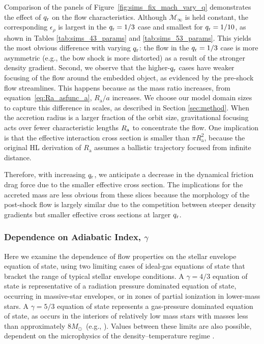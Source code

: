 Comparison of the panels of Figure~\ref{fig:sims_fix_mach_vary_q} demonstrates the effect of $q_{\rm r}$ on the flow characteristics. 
Although $\mathcal{M}_\infty$ is held constant, the corresponding $\epsilon_\rho$ is largest in the $q_{\rm r} = 1/3$ case and smallest for $q_{\rm r} = 1/10$, as shown in Tables \ref{tab:sims_43_params} and \ref{tab:sims_53_params}. This yields the most obvious difference with varying $q_{\rm r}$: the flow in the $q_{\rm r}=1/3$ case is more asymmetric (e.g., the bow shock is more distorted) as a result of the stronger density gradient. Second, we observe that the higher-$q_{\rm r}$ cases have weaker focusing of the flow around the embedded object, as evidenced by the pre-shock flow streamlines. This happens because as the mass ratio increases, from equation~\eqref{eq:Ra_asfunc_a}, $R_{\mathrm a}/a$ increases. We choose our model domain sizes to capture this difference in scales, as described in Section \ref{sec:method}. When the accretion radius is a larger fraction of the orbit size, gravitational focusing acts over fewer characteristic lengths $R_{\rm a}$ to concentrate the flow. One implication is that the effective interaction cross section is smaller than $\pi R_{\mathrm{a}}^2$, because the original HL derivation of $R_{\mathrm{a}}$ assumes a ballistic trajectory focused from infinite distance. 

Therefore, with increasing $q_{\rm r}$, we anticipate a decrease in the dynamical friction drag force due to the smaller effective cross section. The implications for the accreted mass are less obvious from these slices because the morphology of the post-shock flow is largely similar due to the competition between steeper density gradients but smaller effective cross sections at larger $q_{\rm r}$. 

\subsubsection{Dependence on Adiabatic Index, $\gamma$}\label{sec:hydro_gamma}

Here we examine the dependence of flow properties on the stellar envelope equation of state, using two limiting cases of ideal-gas equations of state that bracket the range of typical stellar envelope conditions. 
A $\gamma=4/3$ equation of state is representative of a radiation pressure dominated equation of state, occurring in massive-star envelopes, or in zones of partial ionization in lower-mass stars. A $\gamma=5/3$ equation of state represents a gas-pressure dominated equation of state, as occurs in the interiors of relatively low mass stars with masses less than approximately $ 8 M_\odot$~(e.g., \cite{MacLeod:2017,Murguia-Berthier:2017}). Values between these limits are also possible, dependent on the microphysics of the density--temperature regime \cite{Murguia-Berthier:2017}.

